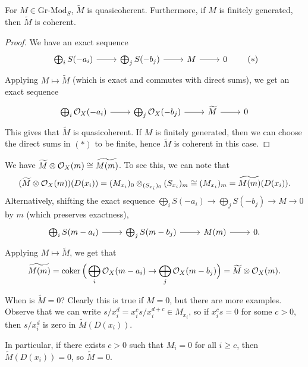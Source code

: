 \begin{prop}
  For $M \in \mathrm{Gr}\text{-}\mathrm{Mod}_S$,
  $\widetilde{M}$ is quasicoherent.
  Furthermore, if $M$ is finitely generated,
  then $\widetilde{M}$ is coherent.
\end{prop}

\begin{proof}
  We have an exact sequence
  \[
    \begin{tikzcd}
      \bigoplus_i S(-a_i) \ar[r]
      & \bigoplus_j S(-b_j) \ar[r]
      & M \ar[r] & 0
    \end{tikzcd} \tag{$*$}
  \]
  Applying $M \mapsto \widetilde{M}$
  (which is exact and commutes with direct sums),
  we get an exact sequence
  \[
    \begin{tikzcd}
      \bigoplus_i \OO_X(-a_i) \ar[r]
      & \bigoplus_j \OO_X(-b_j) \ar[r]
      & \widetilde{M} \ar[r] & 0
    \end{tikzcd}
  \]
  This gives that $\widetilde{M}$ is
  quasicoherent. If $M$ is finitely
  generated, then we can choose the
  direct sums in $(*)$ to be finite, hence
  $\widetilde{M}$ is coherent in this case.
\end{proof}

\begin{remark}
  We have $\widetilde{M} \otimes \mathcal{O}_X(m) \cong \widetilde{M(m)}$.
  To see this, we can note that
  \[
    (\widetilde{M} \otimes \mathcal{O}_X(m))(D(x_i))
    = (M_{x_i})_0 \otimes_{(S_{x_i})_0} (S_{x_i})_m
    \cong (M_{x_i})_m
    = \widetilde{M(m)}(D(x_i)).
  \]
  Alternatively, shifting the exact sequence
  $\bigoplus_i S(-a_i) \to \bigoplus_j S(-b_j) \to M \to 0$ by $m$
  (which preserves exactness),
  \[
    \begin{tikzcd}
      \bigoplus_i S(m - a_i) \ar[r]
      & \bigoplus_j S(m - b_j) \ar[r]
      & M(m) \ar[r] & 0.
    \end{tikzcd}
  \]
  Applying $M \mapsto \widetilde{M}$, we get
  that
  \[
    \widetilde{M(m)}
    = \operatorname{coker}\Big(\bigoplus_{i} \mathcal{O}_X(m - a_i) \to \bigoplus_j \mathcal{O}_X(m - b_j) \Big)
    = \widetilde{M} \otimes \mathcal{O}_X(m).
  \]
\end{remark}

\begin{remark}
  When is $\widetilde{M} = 0$? Clearly
  this is true if $M = 0$,
  but there are more examples.
  Observe that
  we can write
  $s / x_i^d = x_i^c s / x_i^{d + c} \in M_{x_i}$,
  so if $x_i^c s = 0$ for some $c > 0$, then
  $s / x_i^d$ is zero in $\widetilde{M}(D(x_i))$.

  In particular, if there exists $c > 0$
  such that $M_i = 0$ for all $i \ge c$,
  then $\widetilde{M}(D(x_i)) = 0$, so
  $\widetilde{M} = 0$.
\end{remark}

